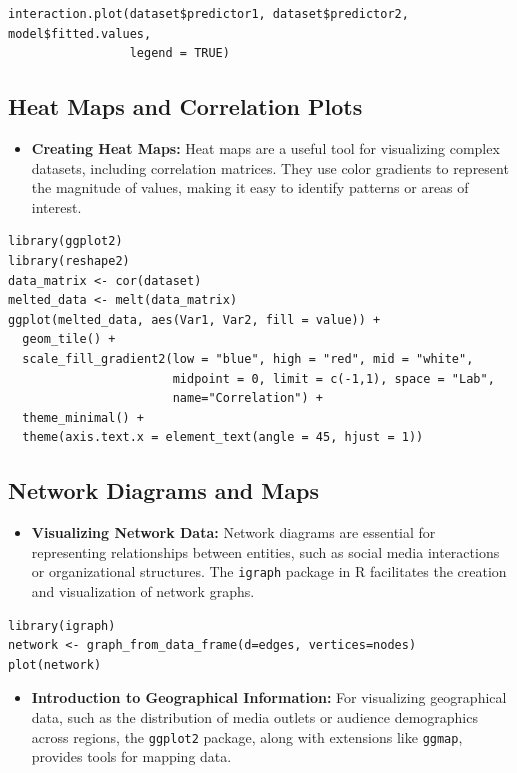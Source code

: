 \documentclass[
]{book}
\providecommand{\tightlist}{%
  \setlength{\itemsep}{0pt}\setlength{\parskip}{0pt}}
\begin{document}
\begin{verbatim}
interaction.plot(dataset$predictor1, dataset$predictor2, model$fitted.values,
                 legend = TRUE)
\end{verbatim}

\subsection{Heat Maps and Correlation Plots}\label{heat-maps-and-correlation-plots}

\begin{itemize}
\tightlist
\item
  \textbf{Creating Heat Maps:} Heat maps are a useful tool for visualizing complex datasets, including correlation matrices. They use color gradients to represent the magnitude of values, making it easy to identify patterns or areas of interest.
\end{itemize}

\begin{verbatim}
library(ggplot2)
library(reshape2)
data_matrix <- cor(dataset)
melted_data <- melt(data_matrix)
ggplot(melted_data, aes(Var1, Var2, fill = value)) + 
  geom_tile() + 
  scale_fill_gradient2(low = "blue", high = "red", mid = "white", 
                       midpoint = 0, limit = c(-1,1), space = "Lab", 
                       name="Correlation") +
  theme_minimal() +
  theme(axis.text.x = element_text(angle = 45, hjust = 1))
\end{verbatim}

\subsection{Network Diagrams and Maps}\label{network-diagrams-and-maps}

\begin{itemize}
\tightlist
\item
  \textbf{Visualizing Network Data:} Network diagrams are essential for representing relationships between entities, such as social media interactions or organizational structures. The \texttt{igraph} package in R facilitates the creation and visualization of network graphs.
\end{itemize}

\begin{verbatim}
library(igraph)
network <- graph_from_data_frame(d=edges, vertices=nodes)
plot(network)
\end{verbatim}

\begin{itemize}
\tightlist
\item
  \textbf{Introduction to Geographical Information:} For visualizing geographical data, such as the distribution of media outlets or audience demographics across regions, the \texttt{ggplot2} package, along with extensions like \texttt{ggmap}, provides tools for mapping data.
\end{itemize}
\end{document}

